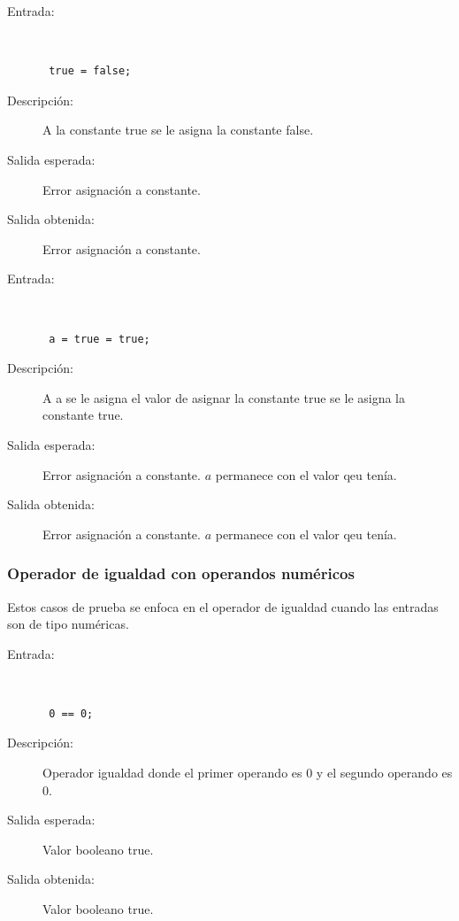 \begin{framed}
	\begin{description}
		\item [Entrada:] \hfill \\
\begin{lstlisting}
 true = false;
\end{lstlisting}
		\item [Descripción:] A la constante true se le asigna la constante false.
		\item [Salida esperada:] Error asignación a constante.
		\item [Salida obtenida:] Error asignación a constante.
	\end{description}
\end{framed}

\begin{framed}
	\begin{description}
		\item [Entrada:] \hfill \\
\begin{lstlisting}
 a = true = true;
\end{lstlisting}
		\item [Descripción:] A a se le asigna el valor de asignar la constante true se le asigna la constante true.
		\item [Salida esperada:] Error asignación a constante. $a$ permanece con el valor qeu tenía.
		\item [Salida obtenida:] Error asignación a constante. $a$ permanece con el valor qeu tenía.
	\end{description}
\end{framed}


\subsubsection{Operador de igualdad con operandos numéricos}
Estos casos de prueba se enfoca en el operador de igualdad cuando las entradas son de tipo numéricas.

\begin{framed}
	\begin{description}
		\item [Entrada:] \hfill \\
\begin{lstlisting}
 0 == 0;
\end{lstlisting}
		\item [Descripción:] Operador igualdad donde el primer operando es 0 y el segundo operando es  0.
		\item [Salida esperada:] Valor booleano true.
		\item [Salida obtenida:] Valor booleano true.
	\end{description}
\end{framed}

